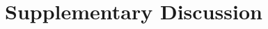 \documentclass{article}
\begin{document}


\section{Supplementary Discussion} \label{section: discussion}
\end{document}
